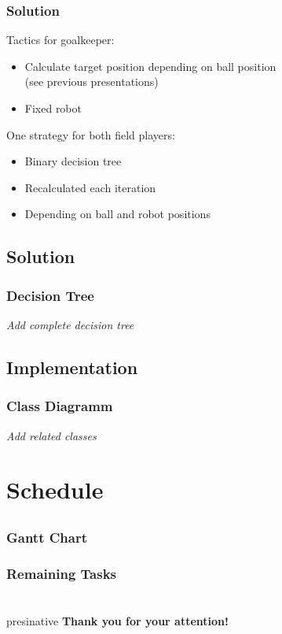 \documentclass[hyperref={pdfpagelabels=false}]{beamer}
\begin{document}
\begin{frame}
    \frametitle{Solution}
    Tactics for goalkeeper:\\
    \begin{itemize}
        \item Calculate target position depending on ball position\\
        (see previous presentations)
        \item Fixed robot
    \end{itemize}
    
    One strategy for both field players:\\
    \begin{itemize}
        \item Binary decision tree
        \item Recalculated each iteration
        \item Depending on ball and robot positions
    \end{itemize}

\end{frame}

\subsection{Solution}
\begin{frame}
    \frametitle{Decision Tree}
    \textit{Add complete decision tree}
\end{frame}

\subsection{Implementation}
\begin{frame}
    \frametitle{Class Diagramm}
    \textit{Add related classes}
\end{frame}

\section{Schedule}
\subsection{}
\begin{frame}
    \frametitle{Gantt Chart}
\end{frame}

\begin{frame}
    \frametitle{Remaining Tasks}
\end{frame}

\section{}
\begin{frame}
	\hfill
	\begin{beamercolorbox}[shadow=true, rounded=true, wd=10cm]{presinative}
		\centering
		\Large{\textbf{Thank you for your attention!}}
	\end{beamercolorbox}
	\hfill
\end{frame}
\end{document}

